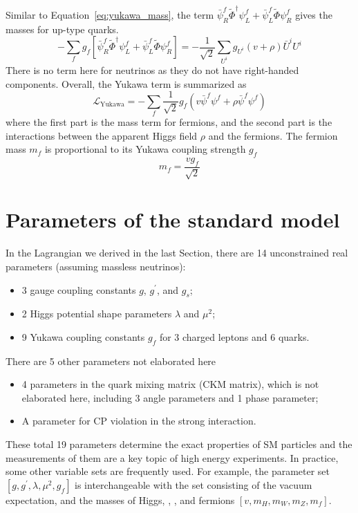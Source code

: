 Similar to Equation~\ref{eq:yukawa_mass}, the term $\bar{\psi}^{f}_{R}\tilde{\Phi}^{\dagger}\psi^{f}_{L} + \bar{\psi}^{f}_{L}\tilde{\Phi}\psi^{f}_{R}$ gives the masses for up-type quarks.
\begin{equation}
    - \sum_{f} g_{f} [\bar{\psi}^{f}_{R}\tilde{\Phi}^{\dagger}\psi^{f}_{L} + \bar{\psi}^{f}_{L}\tilde{\Phi}\psi^{f}_{R}]
    = - \frac{1}{\sqrt{2}} \sum_{U^{i}} g_{U^{i}}  (v+\rho) \bar{U}^{i} U^{i}
\end{equation}
There is no term here for neutrinos as they do not have right-handed components.
Overall, the Yukawa term is summarized as
\begin{equation}\label{eq:Lagrangian_yukawa}
    \mathcal{L}_{\text{Yukawa}} = - \sum_{f} \frac{1}{\sqrt{2}} g_{f} (v\bar{\psi}^{f}\psi^{f} + \rho \bar{\psi}^{f}\psi^{f})
\end{equation}
where the first part is the mass term for fermions, 
and the second part is the interactions between the apparent Higgs field $\rho$ and the fermions.
The fermion mass $m_{f}$ is proportional to its Yukawa coupling strength $g_{f}$
\begin{equation}\label{eq:fermion_mass}
    m_{f} = \frac{vg_{f}}{\sqrt{2}}
\end{equation} 


\section{Parameters of the standard model}\label{sec:SM_parameters}

In the Lagrangian we derived in the last Section, there are 14 unconstrained real parameters (assuming massless neutrinos):
\begin{itemize}
  \item 3 gauge coupling constants $g$, $g^{\prime}$, and $g_{s}$;
  \item 2 Higgs potential shape parameters $\lambda$ and $\mu^{2}$;
  \item 9 Yukawa coupling constants $g_{f}$ for 3 charged leptons and 6 quarks.
\end{itemize}
There are 5 other parameters not elaborated here
\begin{itemize}
  \item 4 parameters in the quark mixing matrix (CKM matrix), which is not elaborated here, including 3 angle parameters and 1 phase parameter;
  \item A parameter for CP violation in the strong interaction.
\end{itemize}
These total 19 parameters determine the exact properties of SM particles and the measurements of them are a key topic of high energy experiments. 
In practice, some other variable sets are frequently used. 
For example, the parameter set $[g, g^{\prime}, \lambda, \mu^{2}, g_{f}]$ is interchangeable with 
the set consisting of the vacuum expectation, and the masses of Higgs, \PW, \PZ, and fermions $[v, m_{H}, m_{W}, m_{Z}, m_{f}]$.


